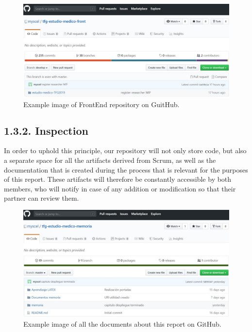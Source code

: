 \begin{itemize}
    \begin{figure}[h]
    \centering
     \includegraphics[width=1\textwidth]{images/GitHubFront.jpg}
    \caption{Example image of FrontEnd repository on GuitHub.}
    \end{figure}
    \end{itemize}
    
    \subsection*{1.3.2. Inspection}
    In order to uphold this principle, our repository will not only store code, but also a separate space for all the artifacts derived from Scrum, as well as the documentation that is created during the process that is relevant for the purposes of this report. These artifacts will therefore be constantly accessible by both members, who will notify in case of any addition or modification so that their partner can review them.\newline
    
    \begin{figure}[h]
    \centering
     \includegraphics[width=1\textwidth]{images/GitHubMemoria.jpg}
    \caption{Example image of all the documents about this report on GitHub.}
    \end{figure}
    \newpage
    

